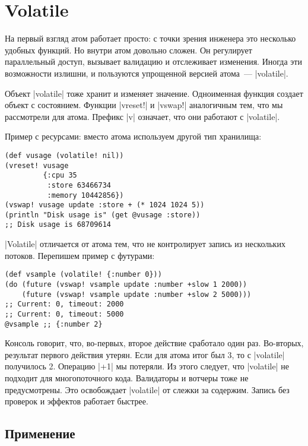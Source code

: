 \section{Volatile}

На первый взгляд атом работает просто: с точки зрения инженера это несколько
удобных функций. Но внутри атом довольно сложен. Он регулирует параллельный
доступ, вызывает валидацию и отслеживает изменения. Иногда эти возможности
излишни, и пользуются упрощенной версией атома~--- \spverb|volatile|.

Объект \spverb|volatile| тоже хранит и изменяет значение. Одноименная функция
создает объект с состоянием. Функции \spverb|vreset!| и \spverb|vswap!|
аналогичным тем, что мы рассмотрели для атома. Префикс \spverb|v| означает, что
они работают с \spverb|volatile|.

Пример с ресурсами: вместо атома используем другой тип хранилища:

\begin{verbatim}
(def vusage (volatile! nil))
(vreset! vusage
         {:cpu 35
          :store 63466734
          :memory 10442856})
(vswap! vusage update :store + (* 1024 1024 5))
(println "Disk usage is" (get @vusage :store))
;; Disk usage is 68709614
\end{verbatim}

\spverb|Volatile| отличается от атома тем, что не контролирует запись из
нескольких потоков. Перепишем пример с футурами:

\begin{verbatim}
(def vsample (volatile! {:number 0}))
(do (future (vswap! vsample update :number +slow 1 2000))
    (future (vswap! vsample update :number +slow 2 5000)))
;; Current: 0, timeout: 2000
;; Current: 0, timeout: 5000
@vsample ;; {:number 2}
\end{verbatim}

Консоль говорит, что, во-первых, второе действие сработало один раз. Во-вторых,
результат первого действия утерян. Если для атома итог был 3, то с
\spverb|volatile| получилось 2. Операцию \spverb|+1| мы потеряли. Из этого
следует, что \spverb|volatile| не подходит для многопоточного кода. Валидаторы и
вотчеры тоже не предусмотрены. Это освобождает \spverb|volatile| от слежки за
содержим. Запись без проверок и эффектов работает быстрее.

\subsection{Применение}

